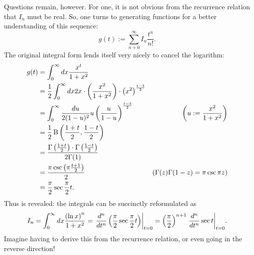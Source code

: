 Questions remain, however.
For one, it is not obvious from the recurrence relation that $I_n$ must be real.
So, one turns to generating functions for a better understanding of this sequence:
\[
	g(t) := \sum_{n+0}^\infty I_n \frac{t^n}{n!}.
\]
The original integral form lends itself very nicely to cancel the logarithm:
\begin{align*}
	g(t)
	&= \int_0^\infty dx \frac{x^t}{1+x^2} \\
    &= \frac{1}{2} \int_0^\infty dx 2x \cdot \left(\frac{x^2}{1+x^2}\right) \cdot \left(x^2\right)^{\frac{t-3}{2}} \\
	&= \int_0^\infty \frac{du}{2(1-u)^2} u \left(\frac{u}{1-u}\right)^{\frac{t-3}{2}} & \left(u := \frac{x^2}{1+x^2}\right) \\
	&= \frac{1}{2} \operatorname{B}\left(\frac{1+t}{2}, \frac{1-t}{2}\right) \\
	&= \frac{\Gamma\left(\frac{1+t}{2}\right) \cdot \Gamma\left(\frac{1-t}{2}\right)}{2\Gamma(1)} \\
	&= \frac{\pi \csc\left(\pi\frac{t+1}{2}\right)}{2} & (\Gamma(z)\Gamma(1-z) = \pi\csc\pi z) \\
	&= \frac{\pi}{2}\sec\frac{\pi}{2} t.
\end{align*}
Thus is revealed: the integrals can be succinctly reformulated as
\[
	I_n = \int_0^\infty dx \frac{\left(\ln x\right)^n}{1+x^2}
	= {\left. \frac{d^n}{dt^n} \left(\frac{\pi}{2}\sec\frac{\pi}{2} t\right) \right|}_{t = 0}
	= \left(\frac{\pi}{2}\right)^{n+1} {\left. \frac{d^n}{dt^n} \sec t \right|}_{t=0}.
\]
Imagine having to derive this from the recurrence relation, or even going in the reverse direction!

